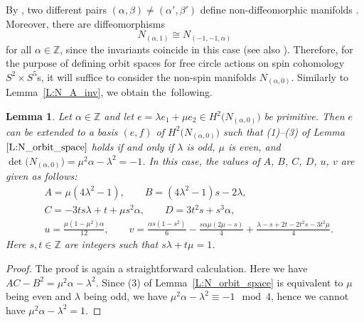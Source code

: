 \documentclass[10pt,a4paper]{amsart}
\numberwithin{equation}{section}
\newtheorem{Lemma}[Theorem]{Lemma}
\theoremstyle{definition}
\numberwithin{table}{section}
\newcommand{\Z}{\mathbb{Z}}
\begin{document}
By \cite[Proposition 4.12]{Re24b}, two different pairs $(\alpha,\beta)\neq (\alpha',\beta')$ define non-diffeomorphic manifolds . Moreover, there are diffeomorphisms
\begin{equation}\label{EQ:N_A_diff}
	N_{(\alpha,1)}\cong N_{(-1,-1,\alpha)}
\end{equation}
for all $\alpha\in\Z$, since the invariants coincide in this case (see also \cite[Lemma~4.17]{Re24b}). Therefore, for the purpose of defining orbit spaces for free circle actions on spin cohomology $S^2\times S^5$s, it will suffice to consider the non-spin manifolds $N_{(\alpha,0)}$. Similarly to Lemma~\ref{L:N_A_inv}, we obtain the~following.
\begin{Lemma}\label{L:N_ab_inv}
	Let $\alpha\in\Z$ and let $e=\lambda e_1+\mu e_2\in H^2\bigl(N_{(\alpha,0)}\bigr)$ be primitive. Then $e$ can be extended to a basis $(e,f)$ of $H^2\bigl(N_{(\alpha,0)}\bigr)$ such that {\rm (1)--(3)} of Lemma~$\ref{L:N_orbit_space}$ holds if and only if $\lambda$ is odd, $\mu$ is even, and
$\det\bigl(N_{(\alpha,0)}\bigr)=\mu^2\alpha-\lambda^2=-1$.
	In this case, the values of $A$, $B$, $C$, $D$, $u$, $v$ are given as follows:
	\begin{align*}
		&A=\mu(4\lambda^2-1),\qquad
		B=(4\lambda^2-1)s-2\lambda,\\
		&C=-3ts\lambda+t+\mu s^2\alpha,\qquad
		D=3t^2s+s^3\alpha,\\
		&u= \frac{\mu(1-\mu^2)\alpha}{12},\qquad
		v=\frac{\alpha s(1-s^2)}{6}-\frac{s\alpha\mu(2\mu-s)}{4}+\frac{\lambda-s+2t-2t^2s-3t^2\mu}{4}.
	\end{align*}
	Here $s,t\in\Z$ are integers such that $s\lambda+t\mu=1$.
\end{Lemma}
\begin{proof}
	The proof is again a straightforward calculation. Here we have $AC-B^2=\mu^2\alpha-\lambda^2$. Since (3) of Lemma~\ref{L:N_orbit_space} is equivalent to $\mu$ being even and $\lambda$ being odd, we have $\mu^2\alpha-\lambda^2\equiv -1\mod4$, hence we cannot have $\mu^2\alpha-\lambda^2=1$.
\end{proof}
\end{document}
